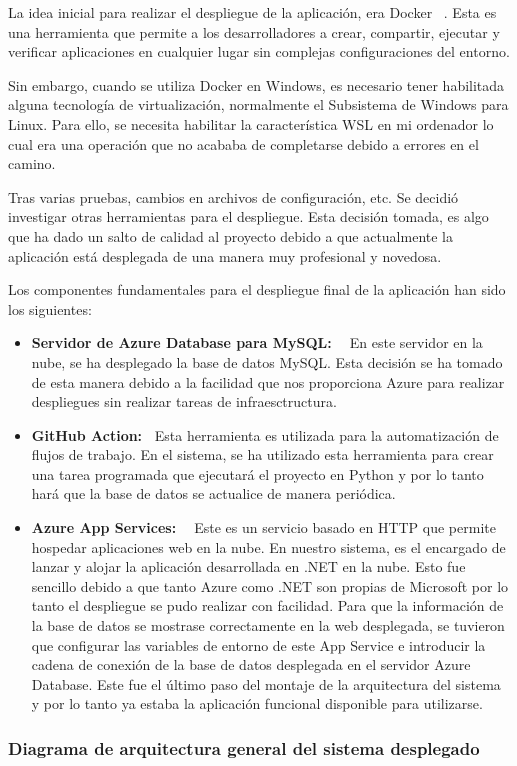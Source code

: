 La idea inicial para realizar el despliegue de la aplicación, era Docker ~\cite{docker:latex}. Esta es una herramienta que permite a los desarrolladores a crear, compartir, ejecutar y verificar aplicaciones en cualquier lugar sin complejas configuraciones del entorno. 

Sin embargo, cuando se utiliza Docker en Windows, es necesario tener habilitada alguna tecnología de virtualización, normalmente el Subsistema de Windows para Linux. Para ello, se necesita habilitar la característica WSL en mi ordenador lo cual era una operación que no acababa de completarse debido a errores en el camino. 

Tras varias pruebas, cambios en archivos de configuración, etc. Se decidió investigar otras herramientas para el despliegue. Esta decisión tomada, es algo que ha dado un salto de calidad al proyecto debido a que actualmente la aplicación está desplegada de una manera muy profesional y novedosa.

Los componentes fundamentales para el despliegue final de la aplicación han sido los siguientes:
\begin{itemize}
    \item \textbf{Servidor de Azure Database para MySQL: ~\cite{azuremysql:latex}} En este servidor en la nube, se ha desplegado la base de datos MySQL. Esta decisión se ha tomado de esta manera debido a la facilidad que nos proporciona Azure para realizar despliegues sin realizar tareas de infraesctructura.
    \item \textbf{GitHub Action:~\cite{githubactions:latex}} Esta herramienta es utilizada para la automatización de flujos de trabajo. En el sistema, se ha utilizado esta herramienta para crear una tarea programada que ejecutará el proyecto en Python y por lo tanto hará que la base de datos se actualice de manera periódica.
    \item \textbf{Azure App Services: ~\cite{azureappservices:latex}} Este es un servicio basado en HTTP que permite hospedar aplicaciones web en la nube. En nuestro sistema, es el encargado de lanzar y alojar la aplicación desarrollada en .NET en la nube. Esto fue sencillo debido a que tanto Azure como .NET son propias de Microsoft por lo tanto el despliegue se pudo realizar con facilidad. Para que la información de la base de datos se mostrase correctamente en la web desplegada, se tuvieron que configurar las variables de entorno de este App Service e introducir la cadena de conexión de la base de datos desplegada en el servidor Azure Database. Este fue el último paso del montaje de la arquitectura del sistema y por lo tanto ya estaba la aplicación funcional disponible para utilizarse. 
\end{itemize}

\newpage
\begin{landscape}
\subsubsection{Diagrama de arquitectura general del sistema desplegado}
\vspace{2cm}
\label{img-diagrama-general}   
\end{landscape}
\newpage








